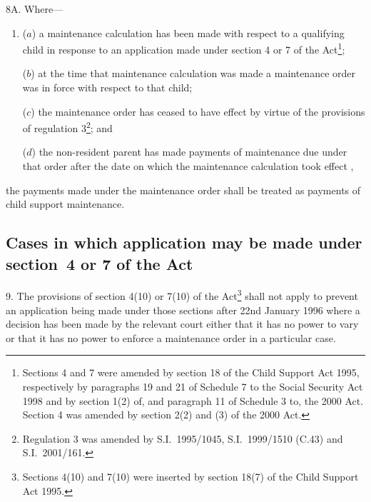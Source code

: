\documentclass[12pt,a4paper]{article}
\begin{document}
8A.  Where—
\begin{enumerate}\item[]
($a$) a maintenance calculation has been made with respect to a qualifying child in response to an application made under section 4 or 7 of the Act\footnote{Sections 4 and 7 were amended by section 18 of the Child Support Act 1995, respectively by paragraphs 19 and 21 of Schedule 7 to the Social Security Act 1998 and by section 1(2) of, and paragraph 11 of Schedule 3 to, the 2000 Act. Section 4 was amended by section 2(2) and (3) of the 2000 Act.};

($b$) at the time that maintenance calculation was made a maintenance order was in force with respect to that child;

($c$) the maintenance order has ceased to have effect by virtue of the provisions of regulation 3\footnote{Regulation 3 was amended by S.I.\ 1995/1045, S.I.\ 1999/1510 (C.43) and S.I.\ 2001/161.}; and

($d$) the non-resident parent has made payments of maintenance due under that order after the date on which the maintenance calculation took effect%
,
\end{enumerate}
the payments made under the maintenance order shall be treated as payments of child support maintenance.


\subsection[9. Cases in which application may be made under section 4 or 7 of the Act]{Cases in which application may be made under section~4 or 7 of the Act}

9.  The provisions of section 4(10) or 7(10) of the Act\footnote{\frenchspacing Sections 4(10) and 7(10) were inserted by section 18(7) of the Child Support Act 1995.} shall not apply to prevent an application being made under those sections after 22nd January 1996 where a decision has been made by the relevant court either that it has no power to vary or that it has no power to enforce a maintenance order in a particular case.
\end{document}
